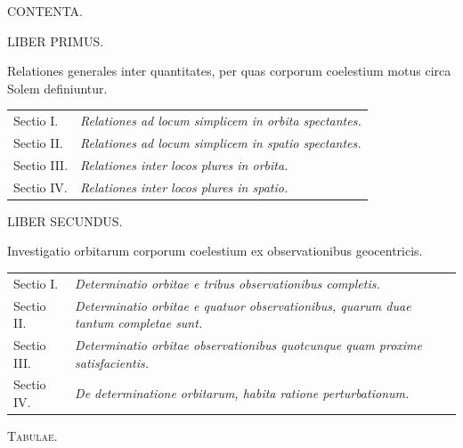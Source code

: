 \clearpage
{}
\begin{center}
{\Large CONTENTA.}\par\bigskip
{\large LIBER PRIMUS.}\par\medskip
Relationes generales inter quantitates, per quas corporum coelestium motus circa Solem definiuntur.
\end{center}
\noindent\begin{tabular}{@{}p{.18\linewidth}p{.78\linewidth}@{}}
Sectio I. & \emph{Relationes ad locum simplicem in orbita spectantes.}\\[.4em]
Sectio II. & \emph{Relationes ad locum simplicem in spatio spectantes.}\\[.4em]
Sectio III. & \emph{Relationes inter locos plures in orbita.}\\[.4em]
Sectio IV. & \emph{Relationes inter locos plures in spatio.}
\end{tabular}
\begin{center}\bigskip
{\large LIBER SECUNDUS.}\par\medskip
Investigatio orbitarum corporum coelestium ex observationibus geocentricis.
\end{center}
\noindent\begin{tabular}{@{}p{.18\linewidth}p{.78\linewidth}@{}}
Sectio I. & \emph{Determinatio orbitae e tribus observationibus completis.}\\[.4em]
Sectio II. & \emph{Determinatio orbitae e quatuor observationibus, quarum duae tantum completae sunt.}\\[.4em]
Sectio III. & \emph{Determinatio orbitae observationibus quotcunque quam proxime satisfacientis.}\\[.4em]
Sectio IV. & \emph{De determinatione orbitarum, habita ratione perturbationum.}
\end{tabular}
\par\bigskip\noindent\textsc{Tabulae.}
